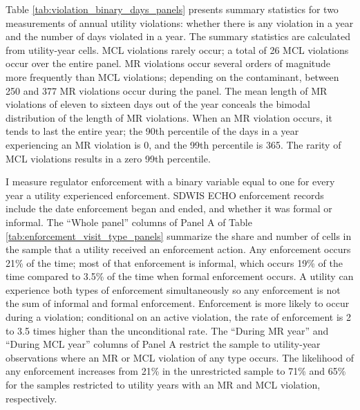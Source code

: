 \documentclass[12pt]{article}
\begin{document}

Table \ref{tab:violation_binary_days_panels} presents summary statistics for two measurements of annual utility violations: whether there is any violation in a year and the number of days violated in a year. The summary statistics are calculated from utility-year cells. MCL violations rarely occur; a total of 26 MCL violations occur over the entire panel. MR violations occur several orders of magnitude more frequently than MCL violations; depending on the contaminant, between 250 and 377 MR violations occur during the panel. The mean length of MR violations of eleven to sixteen days out of the year conceals the bimodal distribution of the length of MR violations. When an MR violation occurs, it tends to last the entire year; the 90th percentile of the days in a year experiencing an MR violation is 0, and the 99th percentile is 365. The rarity of MCL violations results in a zero 99th percentile.


I measure regulator enforcement with a binary variable equal to one for every year a utility experienced enforcement. SDWIS ECHO enforcement records include the date enforcement began and ended, and whether it was formal or informal. The ``Whole panel'' columns of Panel A of Table \ref{tab:enforcement_visit_type_panels} summarize the share and number of cells in the sample that a utility received an enforcement action. Any enforcement occurs 21\% of the time; most of that enforcement is informal, which occurs 19\% of the time compared to 3.5\% of the time when formal enforcement occurs. A utility can experience both types of enforcement simultaneously so any enforcement is not the sum of informal and formal enforcement. Enforcement is more likely to occur during a violation; conditional on an active violation, the rate of enforcement is 2 to 3.5 times higher than the unconditional rate. The ``During MR year'' and ``During MCL year'' columns of Panel A restrict the sample to utility-year observations where an MR or MCL violation of any type occurs. The likelihood of any enforcement increases from 21\% in the unrestricted sample to 71\% and 65\% for the samples restricted to utility years with an MR and MCL violation, respectively.  
\end{document}
